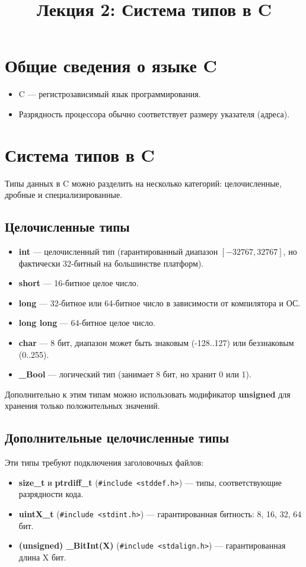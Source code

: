 \documentclass[a4paper,12pt]{article}
\title{\textbf{Лекция 2: Система типов в C}}
\author{}
\date{}
\begin{document}
\tableofcontents %

\maketitle

\section{Общие сведения о языке C}
\begin{itemize}
    \item C — регистрозависимый язык программирования.
    \item Разрядность процессора обычно соответствует размеру указателя (адреса).
\end{itemize}

\section{Система типов в C}
Типы данных в C можно разделить на несколько категорий: целочисленные, дробные и специализированные.

\subsection{Целочисленные типы}
\begin{itemize}
    \item \textbf{int} — целочисленный тип (гарантированный диапазон $[-32767, 32767]$, но фактически 32-битный на большинстве платформ).
    \item \textbf{short} — 16-битное целое число.
    \item \textbf{long} — 32-битное или 64-битное число в зависимости от компилятора и ОС.
    \item \textbf{long long} — 64-битное целое число.
    \item \textbf{char} — 8 бит, диапазон может быть знаковым (-128..127) или беззнаковым (0..255).
    \item \textbf{\_Bool} — логический тип (занимает 8 бит, но хранит 0 или 1).
\end{itemize}

Дополнительно к этим типам можно использовать модификатор \textbf{unsigned} для хранения только положительных значений.

\subsection{Дополнительные целочисленные типы}
Эти типы требуют подключения заголовочных файлов:
\begin{itemize}
    \item \textbf{size\_t} и \textbf{ptrdiff\_t} (\texttt{\#include <stddef.h>}) — типы, соответствующие разрядности кода.
    \item \textbf{uintX\_t} (\texttt{\#include <stdint.h>}) — гарантированная битность: 8, 16, 32, 64 бит.
    \item \textbf{(unsigned) \_BitInt(X)} (\texttt{\#include <stdalign.h>}) — гарантированная длина X бит.
\end{itemize}
\end{document}
